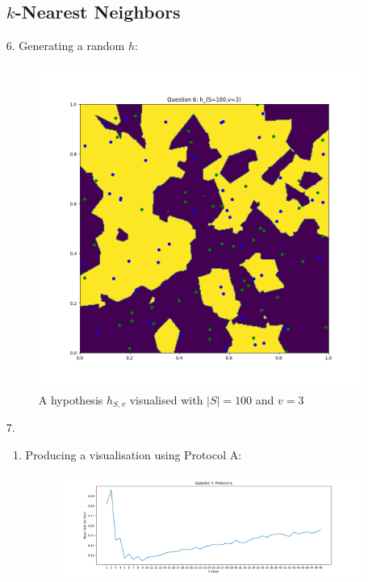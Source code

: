 \documentclass[12pt]{article}
\begin{document}
\begin{enumerate}[leftmargin=\labelsep]
\subsection{$k$-Nearest Neighbors}
\item[6.]Generating a random $h$:
            \begin{figure}[h]
            \centering
            \includegraphics[scale=0.5]{outputs/python/q6/q6}
            \caption{A hypothesis $h_{S,v}$ visualised with $|S|=100$ and $v=3$}
            \label{fig:6a}
            \end{figure}
\newpage
\item[7.]
    \begin{enumerate}
        \item Producing a visualisation using Protocol A:
            \begin{figure}[h]
            \centering
            \includegraphics[scale=0.5]{outputs/python/q7/q7}

\end{figure}
\end{enumerate}
\end{enumerate}
\end{document}
